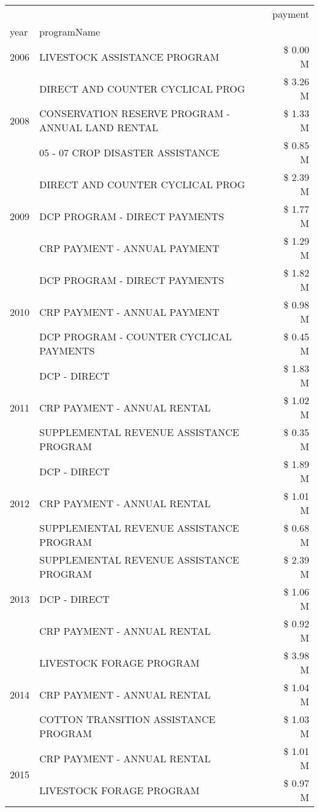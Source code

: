 \begin{tabular}{llr}
\toprule
 &  & payment \\
year & programName &  \\
\midrule
2006 & LIVESTOCK ASSISTANCE PROGRAM & \$ 0.00 M \\
\cline{1-3}
\multirow[t]{3}{*}{2008} & DIRECT AND COUNTER CYCLICAL PROG & \$ 3.26 M \\
 & CONSERVATION RESERVE PROGRAM - ANNUAL LAND RENTAL & \$ 1.33 M \\
 & 05 - 07 CROP DISASTER ASSISTANCE & \$ 0.85 M \\
\cline{1-3}
\multirow[t]{3}{*}{2009} & DIRECT AND COUNTER CYCLICAL PROG & \$ 2.39 M \\
 & DCP PROGRAM - DIRECT PAYMENTS & \$ 1.77 M \\
 & CRP PAYMENT - ANNUAL PAYMENT & \$ 1.29 M \\
\cline{1-3}
\multirow[t]{3}{*}{2010} & DCP PROGRAM - DIRECT PAYMENTS & \$ 1.82 M \\
 & CRP PAYMENT - ANNUAL PAYMENT & \$ 0.98 M \\
 & DCP PROGRAM - COUNTER CYCLICAL PAYMENTS & \$ 0.45 M \\
\cline{1-3}
\multirow[t]{3}{*}{2011} & DCP - DIRECT & \$ 1.83 M \\
 & CRP PAYMENT - ANNUAL RENTAL & \$ 1.02 M \\
 & SUPPLEMENTAL REVENUE ASSISTANCE PROGRAM & \$ 0.35 M \\
\cline{1-3}
\multirow[t]{3}{*}{2012} & DCP - DIRECT & \$ 1.89 M \\
 & CRP PAYMENT - ANNUAL RENTAL & \$ 1.01 M \\
 & SUPPLEMENTAL REVENUE ASSISTANCE PROGRAM & \$ 0.68 M \\
\cline{1-3}
\multirow[t]{3}{*}{2013} & SUPPLEMENTAL REVENUE ASSISTANCE PROGRAM & \$ 2.39 M \\
 & DCP - DIRECT & \$ 1.06 M \\
 & CRP PAYMENT - ANNUAL RENTAL & \$ 0.92 M \\
\cline{1-3}
\multirow[t]{3}{*}{2014} & LIVESTOCK FORAGE PROGRAM & \$ 3.98 M \\
 & CRP PAYMENT - ANNUAL RENTAL & \$ 1.04 M \\
 & COTTON TRANSITION ASSISTANCE PROGRAM & \$ 1.03 M \\
\cline{1-3}
\multirow[t]{3}{*}{2015} & CRP PAYMENT - ANNUAL RENTAL & \$ 1.01 M \\
 & LIVESTOCK FORAGE PROGRAM & \$ 0.97 M \\

\end{tabular}

